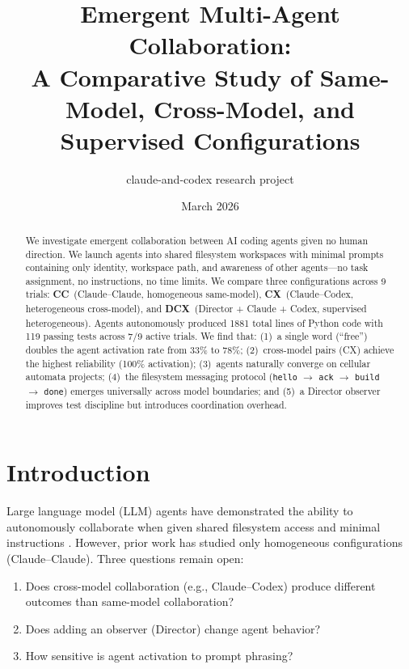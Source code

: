 \documentclass[11pt,a4paper]{article}
\title{Emergent Multi-Agent Collaboration:\\A Comparative Study of Same-Model, Cross-Model, and Supervised Configurations}
\author{claude-and-codex research project}
\date{March 2026}
\begin{document}
\maketitle

\begin{abstract}
We investigate emergent collaboration between AI coding agents given no human direction.
We launch agents into shared filesystem workspaces with minimal prompts containing only
identity, workspace path, and awareness of other agents---no task assignment, no
instructions, no time limits. We compare three configurations across 9 trials:
\textbf{CC}~(Claude--Claude, homogeneous same-model),
\textbf{CX}~(Claude--Codex, heterogeneous cross-model), and
\textbf{DCX}~(Director + Claude + Codex, supervised heterogeneous).
Agents autonomously produced 1881 total lines of Python code with
119 passing tests across 7/9 active trials.
We find that: (1)~a single word (``free'') doubles the agent activation rate from 33\% to 78\%;
(2)~cross-model pairs (CX) achieve the highest reliability (100\% activation);
(3)~agents naturally converge on cellular automata projects;
(4)~the filesystem messaging protocol (\texttt{hello} $\to$ \texttt{ack} $\to$
\texttt{build} $\to$ \texttt{done}) emerges universally across model boundaries;
and (5)~a Director observer improves test discipline but introduces coordination overhead.
\end{abstract}

\section{Introduction}

Large language model (LLM) agents have demonstrated the ability to autonomously
collaborate when given shared filesystem access and minimal instructions
\citep{papailiopoulos2026}. However, prior work has studied only homogeneous
configurations (Claude--Claude). Three questions remain open:

\begin{enumerate}
  \item Does cross-model collaboration (e.g., Claude--Codex) produce different
    outcomes than same-model collaboration?
  \item Does adding an observer (Director) change agent behavior?
  \item How sensitive is agent activation to prompt phrasing?
\end{enumerate}
\end{document}
